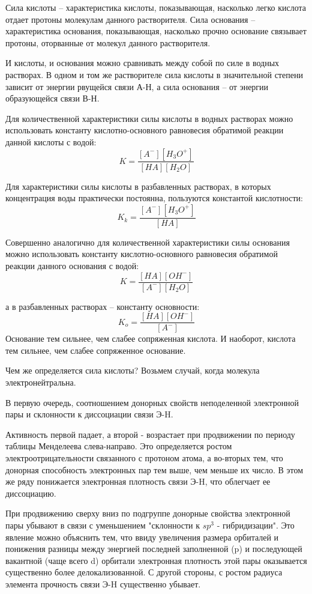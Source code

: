 \documentclass[14pt,a4paper]{scrartcl}
\begin{document}
Сила кислоты – характеристика кислоты, показывающая, насколько легко кислота отдает протоны молекулам данного растворителя.
Сила основания – характеристика основания, показывающая, насколько прочно основание связывает протоны, оторванные от молекул данного растворителя.

 И кислоты, и основания можно сравнивать между собой по силе в водных растворах. В одном и том же растворителе сила кислоты в значительной степени зависит от энергии рвущейся связи А-Н, а сила основания – от энергии образующейся связи В-Н.

Для количественной характеристики силы кислоты в водных растворах можно использовать константу кислотно-основного равновесия обратимой реакции данной кислоты с водой: 
$$K = \frac{\left[A^-\right]\left[H_3O^+\right]}{\left[HA\right]\left[H_2O\right]}$$

Для характеристики силы кислоты в разбавленных растворах, в которых концентрация воды практически постоянна, пользуются константой кислотности: 
$$K_k = \frac{\left[A^-\right]\left[H_3O^+\right]}{\left[HA\right]}$$

Совершенно аналогично для количественной характеристики силы основания можно использовать константу кислотно-основного равновесия обратимой реакции данного основания с водой:
$$K = \frac{\left[HA\right]\left[OH^-\right]}{\left[A^-\right]\left[H_2O\right]}$$

а в разбавленных растворах – константу основности: 
$$K_o = \frac{\left[HA\right]\left[OH^-\right]}{\left[A^-\right]}$$
Основание тем сильнее, чем слабее сопряженная кислота. И наоборот, кислота тем сильнее, чем слабее сопряженное основание.

Чем же определяется сила кислоты? Возьмем случай, когда молекула электронейтральна.

В первую очередь, соотношением донорных свойств неподеленной электронной пары и склонности к диссоциации связи Э-H.

Активность первой падает, а второй - возрастает при продвижении по периоду таблицы Менделеева слева-направо. Это определяется ростом электроотрицательности связанного с протоном атома, а во-вторых тем, что донорная способность электронных пар тем выше, чем меньше их число. В этом же ряду понижается электронная плотность связи Э-H, что облегчает ее диссоциацию.

При продвижению сверху вниз по подгруппе донорные свойства электронной пары убывают в связи с уменьшением "склонности к $sp^3$ - гибридизации". Это явление можно объяснить тем, что ввиду увеличения размера орбиталей и понижения разницы между энергией последней заполненной (p) и последующей вакантной (чаще всего d) орбитали электронная плотность этой пары оказывается существенно более делокализованной. С другой стороны, с ростом радиуса элемента прочность связи Э-H существенно убывает.
\end{document}
